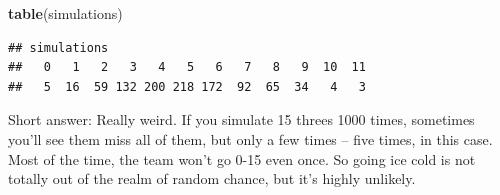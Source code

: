 \documentclass[
]{book}
\newenvironment{Shaded}{\begin{snugshade}}{\end{snugshade}}
\newcommand{\KeywordTok}[1]{\textcolor[rgb]{0.13,0.29,0.53}{\textbf{#1}}}
\newcommand{\NormalTok}[1]{#1}
\begin{document}
\begin{Shaded}
\begin{Highlighting}[]
\KeywordTok{table}\NormalTok{(simulations)}
\end{Highlighting}
\end{Shaded}

\begin{verbatim}
## simulations
##   0   1   2   3   4   5   6   7   8   9  10  11 
##   5  16  59 132 200 218 172  92  65  34   4   3
\end{verbatim}

Short answer: Really weird. If you simulate 15 threes 1000 times, sometimes you'll see them miss all of them, but only a few times -- five times, in this case. Most of the time, the team won't go 0-15 even once. So going ice cold is not totally out of the realm of random chance, but it's highly unlikely.

  
\end{document}

